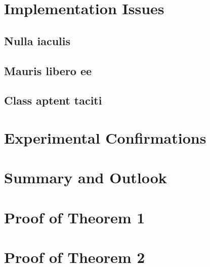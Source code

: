 \chapter{Implementation Issues}
\section{Nulla iaculis}
\lipsum[16-20]
\section{Mauris libero ee}
\lipsum[21-30]
\section{Class aptent taciti}
\lipsum[31-35]

\chapter{Experimental Confirmations}
\lipsum[36-39]

\chapter{Summary and Outlook}
\lipsum

\appendix

\chapter{Proof of Theorem 1}
\lipsum[1-2]

\chapter{Proof of Theorem 2}
\lipsum[3-5]

\theDeclaration

% 
% 

